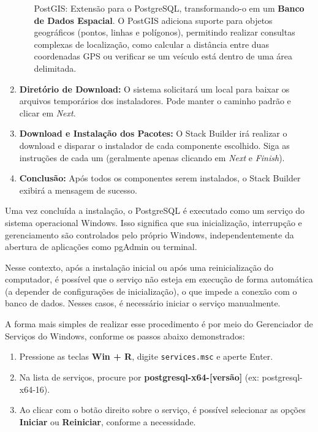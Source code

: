 \begin{enumerate}
\begin{itemize}
        \item[PostGIS:] Extensão para o PostgreSQL, transformando-o em um \textbf{Banco de Dados Espacial}. O PostGIS adiciona suporte para objetos geográficos (pontos, linhas e polígonos), permitindo realizar consultas complexas de localização, como calcular a distância entre duas coordenadas GPS ou verificar se um veículo está dentro de uma área delimitada.
    \end{itemize}

    \item \textbf{Diretório de Download:} O sistema solicitará um local para baixar os arquivos temporários dos instaladores. Pode manter o caminho padrão e clicar em \textit{Next}.

    \item \textbf{Download e Instalação dos Pacotes:} O Stack Builder irá realizar o download e disparar o instalador de cada componente escolhido. Siga as instruções de cada um (geralmente apenas clicando em \textit{Next} e \textit{Finish}).

    \item \textbf{Conclusão:} Após todos os componentes serem instalados, o Stack Builder exibirá a mensagem de sucesso.
\end{enumerate}

Uma vez concluída a instalação, o PostgreSQL é executado como um serviço do sistema operacional Windows. Isso significa que sua inicialização, interrupção e gerenciamento são controlados pelo próprio Windows, independentemente da abertura de aplicações como pgAdmin ou terminal. 

Nesse contexto, após a instalação inicial ou após uma reinicialização do computador, é possível que o serviço não esteja em execução de forma automática (a depender de configurações de inicialização), o que impede a conexão com o banco de dados. Nesses casos, é necessário iniciar o serviço manualmente.

A forma mais simples de realizar esse procedimento é por meio do Gerenciador de Serviços do Windows, conforme os passos abaixo demonstrados:

\begin{enumerate}
    \item Pressione as teclas \textbf{Win + R}, digite \texttt{services.msc} e aperte Enter.
    \item Na lista de serviços, procure por \textbf{postgresql-x64-[versão]} (ex: postgresql-x64-16).
    \item Ao clicar com o botão direito sobre o serviço, é possível selecionar as opções \textbf{Iniciar} ou \textbf{Reiniciar}, conforme a necessidade.
\end{enumerate}

